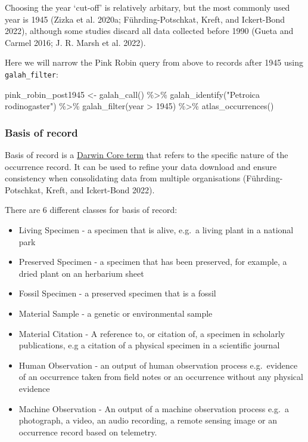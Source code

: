 \documentclass[
  letterpaper,
  DIV=11,
  numbers=noendperiod,
  oneside]{scrreprt}
\newenvironment{Shaded}{\begin{snugshade}}{\end{snugshade}}
\newcommand{\DecValTok}[1]{\textcolor[rgb]{0.68,0.00,0.00}{#1}}
\newcommand{\FunctionTok}[1]{\textcolor[rgb]{0.28,0.35,0.67}{#1}}
\newcommand{\NormalTok}[1]{\textcolor[rgb]{0.00,0.23,0.31}{#1}}
\newcommand{\OtherTok}[1]{\textcolor[rgb]{0.00,0.23,0.31}{#1}}
\newcommand{\SpecialCharTok}[1]{\textcolor[rgb]{0.37,0.37,0.37}{#1}}
\newcommand{\StringTok}[1]{\textcolor[rgb]{0.13,0.47,0.30}{#1}}
\providecommand{\tightlist}{%
  \setlength{\itemsep}{0pt}\setlength{\parskip}{0pt}}\usepackage{longtable,booktabs,array}
\begin{document}
Choosing the year `cut-off' is relatively arbitary, but the most
commonly used year is 1945 (Zizka et al. 2020a; Führding-Potschkat,
Kreft, and Ickert-Bond 2022), although some studies discard all data
collected before 1990 (Gueta and Carmel 2016; J. R. Marsh et al. 2022).

Here we will narrow the Pink Robin query from above to records after
1945 using \texttt{galah\_filter}:

\begin{Shaded}
\begin{Highlighting}[]
\NormalTok{pink\_robin\_post1945 }\OtherTok{\textless{}{-}} \FunctionTok{galah\_call}\NormalTok{() }\SpecialCharTok{\%\textgreater{}\%} 
  \FunctionTok{galah\_identify}\NormalTok{(}\StringTok{"Petroica rodinogaster"}\NormalTok{) }\SpecialCharTok{\%\textgreater{}\%} 
  \FunctionTok{galah\_filter}\NormalTok{(year }\SpecialCharTok{\textgreater{}} \DecValTok{1945}\NormalTok{) }\SpecialCharTok{\%\textgreater{}\%} 
  \FunctionTok{atlas\_occurrences}\NormalTok{()}
\end{Highlighting}
\end{Shaded}

\hypertarget{basis-of-record}{%
\subsubsection{Basis of record}\label{basis-of-record}}

Basis of record is a
\href{https://dwc.tdwg.org/terms/\#dwc:basisOfRecord}{Darwin Core term}
that refers to the specific nature of the occurrence record. It can be
used to refine your data download and ensure consistency when
consolidating data from multiple organisations (Führding-Potschkat,
Kreft, and Ickert-Bond 2022).

There are 6 different classes for basis of record:

\begin{itemize}
\tightlist
\item
  Living Specimen - a specimen that is alive, e.g.~a living plant in a
  national park
\item
  Preserved Specimen - a specimen that has been preserved, for example,
  a dried plant on an herbarium sheet
\item
  Fossil Specimen - a preserved specimen that is a fossil
\item
  Material Sample - a genetic or environmental sample
\item
  Material Citation - A reference to, or citation of, a specimen in
  scholarly publications, e.g a citation of a physical specimen in a
  scientific journal
\item
  Human Observation - an output of human observation process
  e.g.~evidence of an occurrence taken from field notes or an occurrence
  without any physical evidence
\item
  Machine Observation - An output of a machine observation process
  e.g.~a photograph, a video, an audio recording, a remote sensing image
  or an occurrence record based on telemetry.
\end{itemize}
\end{document}

